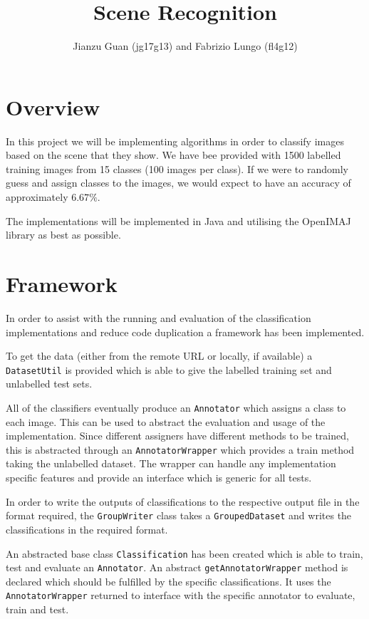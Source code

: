 \documentclass[paper=a4]{article}
\begin{document}
\title{Scene Recognition}
\author{Jianzu Guan (jg17g13) and Fabrizio Lungo (fl4g12)}
\maketitle

\section{Overview}

In this project we will be implementing algorithms in order to classify images based on the scene that they show. We have bee provided with 1500 labelled training images from 15 classes (100 images per class). If we were to randomly guess and assign classes to the images, we would expect to have an accuracy of approximately $6.67\%$.

The implementations will be implemented in Java and utilising the OpenIMAJ library as best as possible.

\section{Framework}

In order to assist with the running and evaluation of the classification implementations and reduce code duplication a framework has been implemented.

To get the data (either from the remote URL or locally, if available) a \texttt{DatasetUtil} is provided which is able to give the labelled training set and unlabelled test sets.

All of the classifiers eventually produce an \texttt{Annotator} which assigns a class to each image. This can be used to abstract the evaluation and usage of the implementation. Since different assigners have different methods to be trained, this is abstracted through an \texttt{AnnotatorWrapper} which provides a train method taking the unlabelled dataset. The wrapper can handle any implementation specific features and provide an interface which is generic for all tests.

In order to write the outputs of classifications to the respective output file in the format required, the \texttt{GroupWriter} class takes a \texttt{GroupedDataset} and writes the classifications in the required format.

An abstracted base class \texttt{Classification} has been created which is able to train, test and evaluate an \texttt{Annotator}. An abstract \texttt{getAnnotatorWrapper} method is declared which should be fulfilled by the specific classifications. It uses the \texttt{AnnotatorWrapper} returned to interface with the specific annotator to evaluate, train and test.
\end{document}
